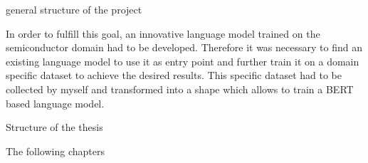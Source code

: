 general structure of the project

In order to fulfill this goal, an innovative language model trained on the semiconductor domain had to be developed. Therefore it was necessary to find an existing language model to use it as entry point and further train it on a domain specific dataset to achieve the desired results. This specific dataset had to be collected by myself and transformed into a shape which allows to train a BERT based language model.

Structure of the thesis

The following chapters 

